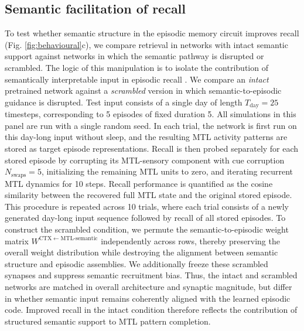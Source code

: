 \documentclass{article}
\begin{document}
\subsection*{Semantic facilitation of recall}
To test whether semantic structure in the episodic memory circuit improves recall (Fig. \ref{fig:behavioural}c), we compare retrieval in networks with intact semantic support against networks in which the semantic pathway is disrupted or scrambled. The logic of this manipulation is to isolate the contribution of semantically interpretable input in episodic recall .
\newline\newline
We compare an \emph{intact} pretrained network against a \emph{scrambled} version in which semantic-to-episodic guidance is disrupted. Test input consists of a single day of length $T_\mathrm{day}=25$ timesteps, corresponding to 5 episodes of fixed duration 5. All simulations in this panel are run with a single random seed.
\newline\newline
In each trial, the network is first run on this day-long input without sleep, and the resulting MTL activity patterns are stored as target episode representations. Recall is then probed separately for each stored episode by corrupting its MTL-sensory component with cue corruption $N_\mathrm{swaps}=5$, initializing the remaining MTL units to zero, and iterating recurrent MTL dynamics for 10 steps. Recall performance is quantified as the cosine similarity between the recovered full MTL state and the original stored episode. This procedure is repeated across 10 trials, where each trial consists of a newly generated day-long input sequence followed by recall of all stored episodes.
\newline\newline
To construct the scrambled condition, we permute the semantic-to-episodic weight matrix $W^{\mathrm{CTX}\leftarrow \mathrm{MTL\text{-}semantic}}$ independently across rows, thereby preserving the overall weight distribution while destroying the alignment between semantic structure and episodic assemblies. We additionally freeze these scrambled synapses and suppress semantic recruitment bias. Thus, the intact and scrambled networks are matched in overall architecture and synaptic magnitude, but differ in whether semantic input remains coherently aligned with the learned episodic code. Improved recall in the intact condition therefore reflects the contribution of structured semantic support to MTL pattern completion.
\end{document}
